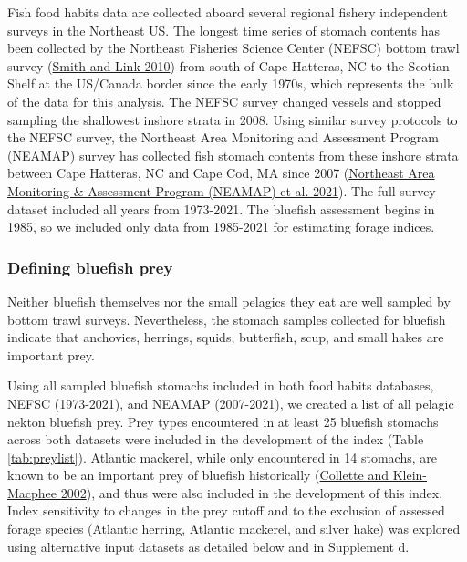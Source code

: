 \documentclass[
]{article}
\begin{document}
Fish food habits data are collected aboard several regional fishery independent surveys in the Northeast US. The longest time series of stomach contents has been collected by the Northeast Fisheries Science Center (NEFSC) bottom trawl survey (\protect\hyperlink{ref-smith_trophic_2010}{Smith and Link 2010}) from south of Cape Hatteras, NC to the Scotian Shelf at the US/Canada border since the early 1970s, which represents the bulk of the data for this analysis. The NEFSC survey changed vessels and stopped sampling the shallowest inshore strata in 2008. Using similar survey protocols to the NEFSC survey, the Northeast Area Monitoring and Assessment Program (NEAMAP) survey has collected fish stomach contents from these inshore strata between Cape Hatteras, NC and Cape Cod, MA since 2007 (\protect\hyperlink{ref-northeast_area_monitoring__assessment_program_neamap_monitoring_2021}{Northeast Area Monitoring \& Assessment Program (NEAMAP) et al. 2021}). The full survey dataset included all years from 1973-2021. The bluefish assessment begins in 1985, so we included only data from 1985-2021 for estimating forage indices.

\hypertarget{defining-bluefish-prey}{%
\subsubsection{Defining bluefish prey}\label{defining-bluefish-prey}}

Neither bluefish themselves nor the small pelagics they eat are well sampled by bottom trawl surveys. Nevertheless, the stomach samples collected for bluefish indicate that anchovies, herrings, squids, butterfish, scup, and small hakes are important prey.

Using all sampled bluefish stomachs included in both food habits databases, NEFSC (1973-2021), and NEAMAP (2007-2021), we created a list of all pelagic nekton bluefish prey. Prey types encountered in at least 25 bluefish stomachs across both datasets were included in the development of the index (Table \ref{tab:preylist}). Atlantic mackerel, while only encountered in 14 stomachs, are known to be an important prey of bluefish historically (\protect\hyperlink{ref-collette_bigelow_2002}{Collette and Klein-Macphee 2002}), and thus were also included in the development of this index. Index sensitivity to changes in the prey cutoff and to the exclusion of assessed forage species (Atlantic herring,
Atlantic mackerel, and silver hake) was explored using alternative input datasets as detailed below and in Supplement d.
\end{document}
